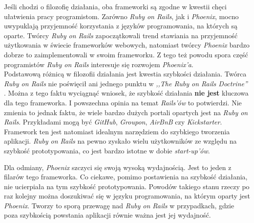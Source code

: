 \documentclass[mgr,oneside]{mgr}
\begin{document}
Jeśli chodzi o filozofię działania, oba frameworki są zgodne w kwestii chęci ułatwienia pracy programistom. Zarówno \textit{Ruby on Rails}, jak i \textit{Phoenix}, mocno uwypuklają przyjemność korzystania z języków programowania, na których są oparte. Twórcy \textit{Ruby on Rails} zapoczątkowali trend stawiania na przyjemność użytkowania w świecie frameworków webowych, natomiast twórcy \textit{Phoenix} bardzo dobrze to zaimplementowali w swoim frameworku. Z tego też powodu spora część programistów \textit{Ruby on Rails} interesuje się rozwojem \textit{Phoenix'a}.\\

Podstawową różnicą w filozofii działania jest kwestia szybkości działania. Twórca \textit{Ruby on Rails} nie poświęcił ani jednego punktu w \emph{,,The Ruby on Rails Doctrine''} \cite{rails_doctrine}. Można z tego faktu wyciągnąć wniosek, że szybkość działania \textbf{nie jest} kluczowa dla tego frameworka. I powszechna opinia na temat \textit{Rails'ów} to potwierdzi. Nie zmienia to jednak faktu, że wiele bardzo dużych portali opartych jest na \textit{Ruby on Rails}. Przykładami mogą być \textit{GitHub}, \textit{Groupon}, \textit{AirBnB} czy \textit{Kickstarter}. Framework ten jest natomiast idealnym narzędziem do szybkiego tworzenia aplikacji. \textit{Ruby on Rails} na pewno zyskało wielu użytkowników ze względu na szybkość prototypowania, co jest bardzo istotne w dobie \textit{start-up'ów}.

Dla odmiany, \textit{Phoenix} szczyci się swoją wysoką wydajnością. Jest to jeden z filarów tego frameworka. Co ciekawe, pomimo postawienia na szybkość działania, nie ucierpiała na tym szybkość prototypowania. Powodów takiego stanu rzeczy po raz kolejny można doszukiwać się w języku programowania, na którym oparty jest \textit{Phoenix}. Tworzy to sporą przewagę nad \textit{Ruby on Rails} w przypadkach, gdzie poza szybkością powstania aplikacji równie ważna jest jej wydajność.
\end{document}
